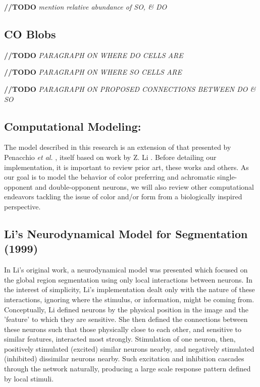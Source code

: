 \documentclass[journal,onecolumn]{IEEEtran}
\begin{document}
\textbf{//TODO} \textit{mention relative abundance of SO, \& DO}


\subsection*{CO Blobs}

\textbf{//TODO} \textit{PARAGRAPH ON WHERE DO CELLS ARE}

\textbf{//TODO} \textit{PARAGRAPH ON WHERE SO CELLS ARE}

\textbf{//TODO} \textit{PARAGRAPH ON PROPOSED CONNECTIONS BETWEEN DO \& SO}


\subsection{Computational Modeling:}

The model described in this research is an extension of that presented by Penacchio \textit{et al.} \cite{otazu:plosive}, itself based on work by Z. Li \cite{li:1998, li:1999}. Before detailing our implementation, it is important to review prior art, these works and others. As our goal is to model the behavior of color preferring and achromatic single-opponent and double-opponent neurons, we will also review other computational endeavors tackling the issue of color and/or form from a biologically inspired perspective.


\subsection*{Li's Neurodynamical Model for Segmentation (1999)}
In Li's original work, a neurodynamical model was presented which focused on the global region segmentation using only local interactions between neurons. In the interest of simplicity, Li's implementation dealt only with the nature of these interactions, ignoring where the stimulus, or information, might be coming from. Conceptually, Li defined neurons by the physical position in the image and the 'feature' to which they are sensitive. She then defined the connections between these neurons such that those physically close to each other, and sensitive to similar features, interacted most strongly. Stimulation of one neuron, then, positively stimulated (excited) similar neurons nearby, and negatively stimulated (inhibited) dissimilar neurons nearby. Such excitation and inhibition cascades through the network naturally, producing a large scale response pattern defined by local stimuli.
\end{document}
